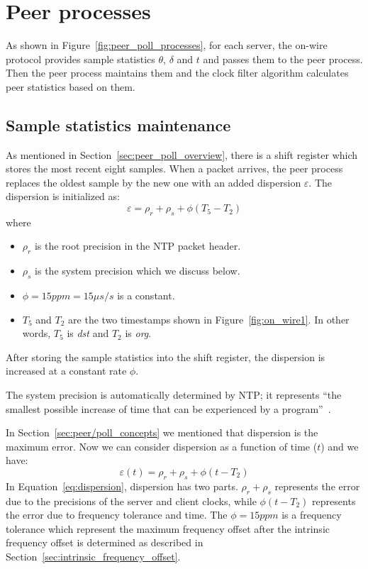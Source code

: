 \section{Peer processes}%
\label{sec:peer_processes}
As shown in Figure~\ref{fig:peer_poll_processes}, 
for each server, the on-wire protocol provides sample statistics $\theta$,
$\delta$ and $t$ and passes them to the peer process. Then the peer process
maintains them and the clock filter algorithm calculates peer statistics based
on them.

\subsection{Sample statistics maintenance}%
\label{sub:sample_statistics_maintenance}
As mentioned in Section~\ref{sec:peer_poll_overview}, there is a shift register
which stores the most recent eight samples. When a packet arrives, the peer
process replaces the oldest sample by the new one with an added dispersion
$\varepsilon$.
The dispersion is initialized as:
$$ \varepsilon = \rho_r + \rho_s + \phi (T_5 - T_2) $$
where 
\begin{itemize}
    \item 
        $\rho_r$ is the root precision in the NTP packet header. 
    \item 
        $\rho_s$ is the system
        precision which we discuss below.
    \item
        $\phi = 15 ppm = 15 \mu s/s$ is a constant.
    \item
        $T_5$ and $T_2$ are the two timestamps shown in
        Figure~\ref{fig:on_wire1}. In other words, $T_5$ is \emph{dst} and
        $T_2$ is \emph{org}.
\end{itemize}
After storing the sample statistics into the shift register, the dispersion
is increased at a constant rate $\phi$. 

The system precision is automatically determined by NTP; it represents 
``the smallest possible increase of time that can be experienced by a
program''~\cite{precision}.

In Section~\ref{sec:peer/poll_concepts} we mentioned that dispersion is the
maximum error. Now we can consider dispersion as a function of time ($t$) and
we have:
\begin{equation}
    \varepsilon(t) = \rho_r + \rho_s + \phi (t - T_2)
    \label{eq:dispersion}
\end{equation}
In Equation~\ref{eq:dispersion}, dispersion has two parts. $\rho_r + \rho_s$
represents the error due to the precisions of the server and client clocks,
while $\phi (t - T_2)$ represents the error due to frequency tolerance and
time.  The $\phi = 15ppm$ is a frequency tolerance which represent the maximum
frequency offset after the intrinsic frequency offset is determined as
described in Section~\ref{sec:intrinsic_frequency_offset}.

